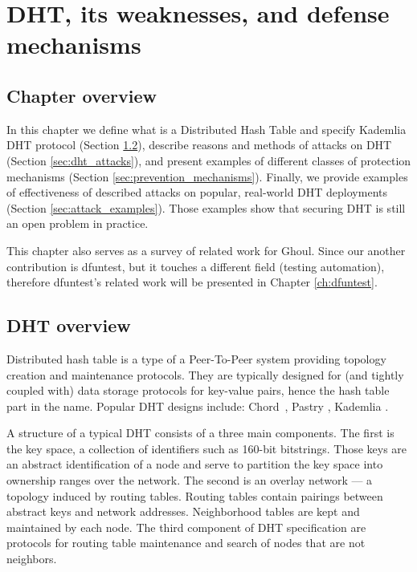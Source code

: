 \chapter{DHT, its weaknesses, and defense mechanisms}
\label{ch:threats}
\section{Chapter overview}
  In this chapter we define what is a Distributed Hash Table and specify
  Kademlia DHT protocol (Section \ref{sec:dht_overview}),
  describe reasons and methods of attacks on DHT (Section
  \ref{sec:dht_attacks}),
  and present examples of different classes of protection mechanisms
  (Section \ref{sec:prevention_mechanisms}).
  Finally, we provide examples of effectiveness of described attacks on popular,
  real-world DHT deployments (Section \ref{sec:attack_examples}).
  Those examples show that securing DHT is still an open problem in practice.

  This chapter also serves as a survey of related work for Ghoul.
  Since our another contribution is dfuntest, but it touches a different field 
  (testing automation), therefore dfuntest's related work will be presented in
  Chapter \ref{ch:dfuntest}.


\section{DHT overview}
\label{sec:dht_overview}

  Distributed hash table is a type of a Peer-To-Peer system providing topology
  creation and maintenance protocols.
  They are typically designed for (and tightly coupled with) data storage
  protocols for key-value pairs, hence the hash table part in the name.
  Popular DHT designs include: Chord~\cite{sto03}, Pastry \cite{row01}, Kademlia
  \cite{may02}.

  A structure of a typical DHT consists of a three main components. The first is
  the key space, a collection of identifiers such as 160-bit bitstrings.
  Those keys are an abstract identification of a node and serve to partition the
  key space into ownership ranges over the network.
  The second is an overlay network --- a topology induced by routing tables.
  Routing tables contain pairings between abstract keys and network addresses.
  Neighborhood tables are kept and maintained by each node.
  The third component of DHT specification are protocols for routing table
  maintenance and search of nodes that are not neighbors.

